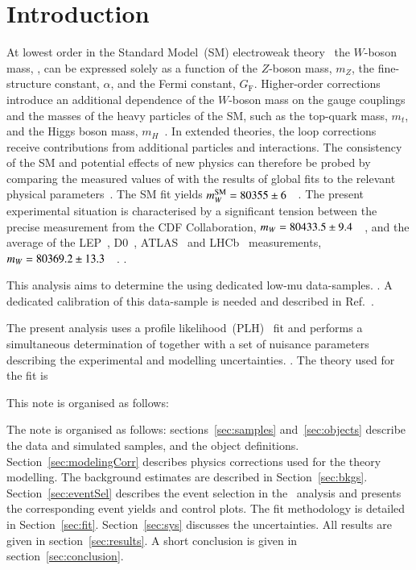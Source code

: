 \chapter{Introduction}
\label{sec:intro}

At lowest order in the Standard Model~(SM) electroweak theory~\cite{GLASHOW1961579,SALAM1964168,PhysRevLett.19.1264} the $W$-boson mass, \mW, can be expressed solely as a function of the $Z$-boson mass, $m_Z$, the fine-structure constant, $\alpha$, and the Fermi constant, $G_\text{F}$. Higher-order corrections introduce an additional dependence of the $W$-boson mass on the gauge couplings and the masses of the heavy particles of the SM, such as the top-quark mass, $m_t$, and the Higgs boson mass, $m_H$~\cite{Sirlin:1980nh,Awramik:2003rn}. In extended theories, the loop corrections receive contributions from additional particles and interactions. The consistency of the SM and potential effects of new physics can therefore be probed by comparing the measured values of \mW with the results of global fits to the relevant physical parameters~\cite{deBlas:2021wap, Haller:2018nnx, Erler:1999ug}. The SM fit yields $m_{W}^\text{SM} = 80355 \pm 6$~\MeV~\cite{deBlas:2021wap, Haller:2018nnx}.
The present experimental situation is characterised by a significant tension between the precise measurement from the CDF Collaboration, $m_{W} = 80433.5 \pm 9.4$~\MeV~\cite{CDF:2022hxs}, and the average of the LEP~\cite{ALEPH:2013dgf}, D0~\cite{Abazov:2012bv}, ATLAS~\cite{STDM-2014-18} and LHCb~\cite{LHCb:2021bjt} measurements, $m_{W} = 80369.2 \pm 13.3$~\MeV~\cite{Amoroso:2023pey}. .


This analysis aims to determine the \mW using dedicated low-mu data-samples. . A dedicated calibration of this data-sample is needed and described in Ref.~\cite{lowMuMw:INT1}.


The present analysis uses a profile likelihood~(PLH)~\cite{Rolke:2004mj} fit and performs a simultaneous determination of \mW together with a set of nuisance parameters describing the experimental and modelling uncertainties. . The theory used for the fit is 


This note is organised as follows: 

The note is organised as follows: sections~\ref{sec:samples} and~\ref{sec:objects} describe the data and simulated samples, and the object definitions.
Section~\ref{sec:modelingCorr} describes physics corrections used for the theory modelling. The background estimates are described in Section~\ref{sec:bkgs}.
Section~\ref{sec:eventSel} describes the event selection in the \Wboson\ analysis and presents the corresponding event yields and control plots.
The fit methodology is detailed in Section~\ref{sec:fit}.
Section~\ref{sec:sys} discusses the uncertainties. All results are given in section~\ref{sec:results}. A short conclusion is given in section~\ref{sec:conclusion}.